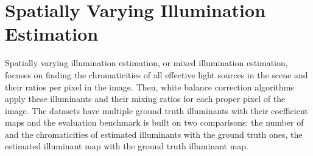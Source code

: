 \section{Spatially Varying Illumination Estimation}
\label{sec:spatially_varying_illumination_estimation}

Spatially varying illumination estimation, or mixed illumination estimation, focuses on finding the chromaticities of all effective light sources in the scene and their ratios per pixel in the image. Then, white balance correction algorithms apply these illuminants and their mixing ratios for each proper pixel of the image. The datasets have multiple ground truth illuminants with their coefficient maps and the evaluation benchmark is built on two comparisons: the number of and the chromaticities of estimated illuminants with the ground truth ones, the estimated illuminant map with the ground truth illuminant map.

